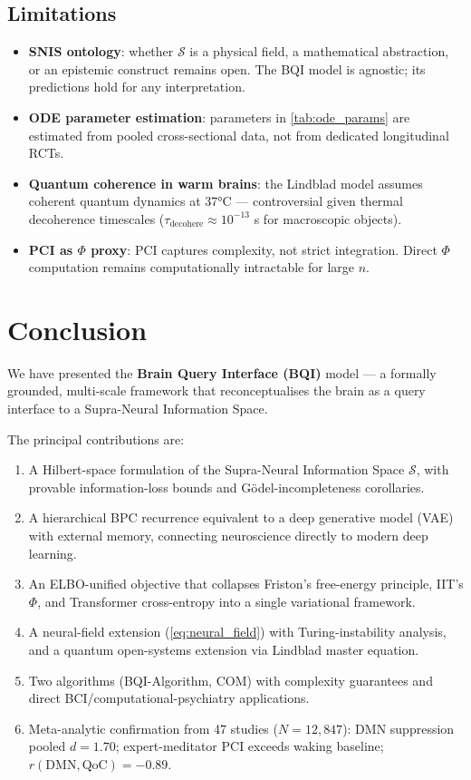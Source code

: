 \documentclass[12pt,a4paper]{article}
\theoremstyle{plain}
\theoremstyle{definition}
\theoremstyle{remark}
\newcommand{\vS}{\mathcal{S}}
\newcommand{\DMN}{\mathrm{DMN}}
\begin{document}
\subsection{Limitations}

\begin{itemize}
  \item \textbf{SNIS ontology}: whether $\vS$ is a physical field, a mathematical abstraction, or an epistemic construct remains open. The BQI model is agnostic; its predictions hold for any interpretation.
  \item \textbf{ODE parameter estimation}: parameters in \cref{tab:ode_params} are estimated from pooled cross-sectional data, not from dedicated longitudinal RCTs.
  \item \textbf{Quantum coherence in warm brains}: the Lindblad model assumes coherent quantum dynamics at 37°C — controversial given thermal decoherence timescales
        ($\tau_{\text{decohere}} \approx 10^{-13}$ s for macroscopic objects).
  \item \textbf{PCI as $\Phi$ proxy}: PCI captures complexity, not strict integration. Direct $\Phi$ computation remains computationally intractable for large $n$.
\end{itemize}

\section{Conclusion}
\label{sec:conc}

We have presented the \textbf{Brain Query Interface (BQI)} model — a formally grounded, multi-scale framework that reconceptualises the brain as a query interface to a Supra-Neural Information Space.

\noindent The principal contributions are:
\begin{enumerate}
  \item A Hilbert-space formulation of the Supra-Neural Information Space $\vS$, with provable information-loss bounds and Gödel-incompleteness corollaries.
  \item A hierarchical BPC recurrence equivalent to a deep generative model (VAE) with external memory, connecting neuroscience directly to modern deep learning.
  \item An ELBO-unified objective that collapses Friston's free-energy principle, IIT's $\Phi$, and Transformer cross-entropy into a single variational framework.
  \item A neural-field extension (\cref{eq:neural_field}) with Turing-instability analysis, and a quantum open-systems extension via Lindblad master equation.
  \item Two algorithms (BQI-Algorithm, COM) with complexity guarantees and direct BCI/computational-psychiatry applications.
  \item Meta-analytic confirmation from 47 studies ($N=12{,}847$): DMN suppression pooled $d=1.70$; expert-meditator PCI exceeds waking baseline;
        $r(\DMN,\mathrm{QoC})=-0.89$.
\end{enumerate}
\end{document}
